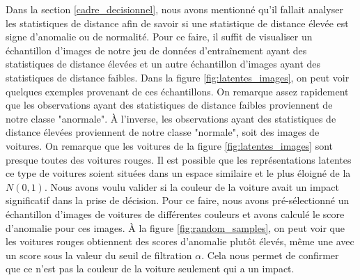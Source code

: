 Dans la section \ref{cadre_decisionnel}, nous avons mentionné qu'il fallait analyser les statistiques de distance afin de savoir si une statistique de distance élevée est signe d'anomalie ou de normalité. Pour ce faire, il suffit de visualiser un échantillon d'images de notre jeu de données d'entraînement ayant des statistiques de distance élevées et un autre échantillon d'images ayant des statistiques de distance faibles. Dans la figure \ref{fig:latentes_images}, on peut voir quelques exemples provenant de ces échantillons. On remarque assez rapidement que les observations ayant des statistiques de distance faibles proviennent de notre classe "anormale". À l'inverse, les observations ayant des statistiques de distance élevées proviennent de notre classe "normale", soit des images de voitures. On remarque que les voitures de la figure \ref{fig:latentes_images} sont presque toutes des voitures rouges. Il est possible que les représentations latentes ce type de voitures soient situées dans un espace similaire et le plus éloigné de la $N(0,1)$. Nous avons voulu valider si la couleur de la voiture avait un impact significatif dans la prise de décision. Pour ce faire, nous avons pré-sélectionné un échantillon d'images de voitures de différentes couleurs et avons calculé le score d'anomalie pour ces images. À la figure \ref{fig:random_samples}, on peut voir que les voitures rouges obtiennent des scores d'anomalie plutôt élevés, même une avec un score sous la valeur du seuil de filtration $\alpha$. Cela nous permet de confirmer que ce n'est pas la couleur de la voiture seulement qui a un impact.

